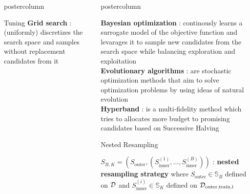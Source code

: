 \documentclass{beamer}
\newlength{\columnheight} %
\begin{document}
\begin{frame}[fragile]{}
\begin{columns}
\begin{column}{.31\textwidth}
\begin{beamercolorbox}[center]{postercolumn}
\begin{minipage}{.98\textwidth}
{\begin{myblock}{Tuning}
\textbf{Grid search} : (uniformly) discretizes the search space and samples without replacement candidates from it\\ 

\end{myblock}



				}
			\end{minipage}
		\end{beamercolorbox}
	\end{column}
	\begin{column}{.31\textwidth}
		\begin{beamercolorbox}[center]{postercolumn}
			\begin{minipage}{.98\textwidth}
				\parbox[t][\columnheight]{\textwidth}{



\textbf{Bayesian optimization} : continously learns a surrogate model of the objective function and levarages it to sample new candidates from the search space while balancing exploration and exploitation\\

\textbf{Evolutionary algorithms} : are stochastic optimization methods that aim to solve optimization problems by using ideas of natural evolution\\

\textbf{Hyperband} : is a multi-fidelity method which tries to allocates more budget to promising candidates based on Successive Halving \\

\begin{myblock}{Nested Resampling}

$S_{B, K} = \left(S_{\mathrm{outer}}, \left(S_{\mathrm{inner}}^{(1)},\dots,S_{\mathrm{inner}}^{(B)}
\right)\right)$ : \textbf{nested resampling strategy} where $S_{\mathrm{outer}} \in \mathds{S}_B$ defined on $\mathcal{D}$ and $S_{\mathrm{inner}}^{(i)} \in \mathds{S}_K$ defined on $\mathcal{D}_{\textrm{outer,train,i}}$\\\


\end{myblock}}
\end{minipage}
\end{beamercolorbox}
\end{column}
\end{columns}
\end{frame}
\end{document}
